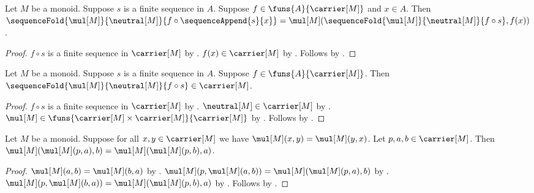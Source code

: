 \begin{proposition}\label{spike_mapped_append_fold}
    Let $M$ be a monoid.
    Suppose $s$ is a finite sequence in $A$.
    Suppose $f\in\funs{A}{\carrier[M]}$ and $x\in A$.
    Then
        $\sequenceFold{\mul[M]}{\neutral[M]}{
            f\circ\sequenceAppend{s}{x}}
        =\mul[M]
            (\sequenceFold{\mul[M]}{\neutral[M]}{f\circ s},f(x))$.
\end{proposition}
\begin{proof}
    $f\circ s$ is a finite sequence in $\carrier[M]$ by
        .
    $f(x)\in\carrier[M]$ by .
    Follows by
        .
\end{proof}

\begin{proposition}\label{spike_mapped_fold_type}
    Let $M$ be a monoid.
    Suppose $s$ is a finite sequence in $A$.
    Suppose $f\in\funs{A}{\carrier[M]}$.
    Then
        $\sequenceFold{\mul[M]}{\neutral[M]}{f\circ s}
            \in\carrier[M]$.
\end{proposition}
\begin{proof}
    $f\circ s$ is a finite sequence in $\carrier[M]$ by
        .
    $\neutral[M]\in\carrier[M]$ by
        .
    $\mul[M]\in
        \funs{\carrier[M]\times\carrier[M]}{\carrier[M]}$ by
        .
    Follows by .
\end{proof}

\begin{proposition}\label{spike_commutative_monoid_exchange}
    Let $M$ be a monoid.
    Suppose for all $x,y\in\carrier[M]$ we have
        $\mul[M](x,y)=\mul[M](y,x)$.
    Let $p,a,b\in\carrier[M]$.
    Then
        $\mul[M](\mul[M](p,a),b)
            =\mul[M](\mul[M](p,b),a)$.
\end{proposition}
\begin{proof}
    $\mul[M](a,b)=\mul[M](b,a)$ by \auto.
    $\mul[M](p,\mul[M](a,b))
        =\mul[M](\mul[M](p,a),b)$ by .
    $\mul[M](p,\mul[M](b,a))
        =\mul[M](\mul[M](p,b),a)$ by .
    Follows by \auto.
\end{proof}


